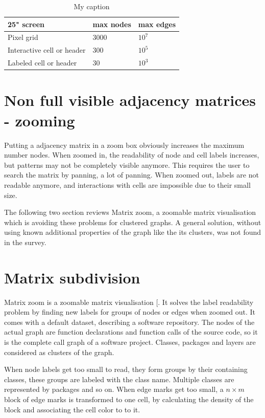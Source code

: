  
\begin{table}[]
\centering
\begin{tabular}{|l|l|l|}
\hline
25" screen                 & max nodes & max edges                \\ \hline
Pixel grid                 & 3000      & $10^7$                     \\ \hline
Interactive cell or header & 300       & $10^5$                     \\ \hline
Labeled cell or header     & 30        & $10^3$                     \\ \hline
\end{tabular}
\caption{My caption}
\label{my-label}
\end{table}



\section{Non full visible adjacency matrices - zooming}
Putting a adjacency matrix in a zoom box obviously increases the maximum number nodes. 
When zoomed in, the readability of node and cell labels increases, but patterns may not be completely visible anymore. This requires the user to search the matrix by panning, a lot of panning. When zoomed out, labels are not readable anymore, and interactions with cells are impossible due to their small size. 

The following two section reviews Matrix zoom, a zoomable matrix visualisation which is avoiding these problems for clustered graphs. A general solution, without using known additional properties of the graph like the its clusters, was not found in the survey.

\section{Matrix subdivision}

Matrix zoom is a zoomable matrix visualisation [\cite{ham-ivis-2003}. It solves the label readability problem by finding new labels for groups of nodes or edges when zoomed out. It comes with a default dataset, describing a software repository. The nodes of the actual graph are function declarations and function calls of the source code, so it is the complete call graph of a software project. Classes, packages and layers are considered as clusters of the graph. 

When node labels get too small to read, they form groups by their containing classes, these groups are labeled with the class name. Multiple classes are represented by packages and so on. When edge marks get too small, a $n \times m$ block of edge marks is transformed to one cell, by calculating the density of the block and associating the cell color to to it.


